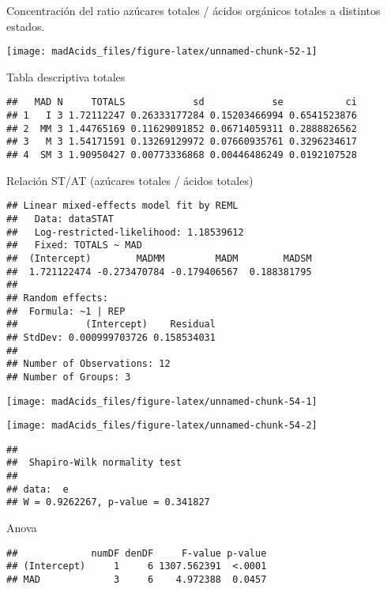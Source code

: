 \documentclass[
]{article}
\begin{document}
Concentración del ratio azúcares totales / ácidos orgánicos totales a
distintos estados.

\begin{center}\texttt{[image: madAcids\_files/figure-latex/unnamed-chunk-52-1]} \end{center}

Tabla descriptiva totales

\begin{verbatim}
##   MAD N     TOTALS            sd            se           ci
## 1   I 3 1.72112247 0.26333177284 0.15203466994 0.6541523876
## 2  MM 3 1.44765169 0.11629091852 0.06714059311 0.2888826562
## 3   M 3 1.54171591 0.13269129972 0.07660935761 0.3296234617
## 4  SM 3 1.90950427 0.00773336868 0.00446486249 0.0192107528
\end{verbatim}

Relación ST/AT (azúcares totales / ácidos totales)

\begin{verbatim}
## Linear mixed-effects model fit by REML
##   Data: dataSTAT 
##   Log-restricted-likelihood: 1.18539612
##   Fixed: TOTALS ~ MAD 
##  (Intercept)        MADMM         MADM        MADSM 
##  1.721122474 -0.273470784 -0.179406567  0.188381795 
## 
## Random effects:
##  Formula: ~1 | REP
##            (Intercept)    Residual
## StdDev: 0.000999703726 0.158534031
## 
## Number of Observations: 12
## Number of Groups: 3
\end{verbatim}

\begin{center}\texttt{[image: madAcids\_files/figure-latex/unnamed-chunk-54-1]} \end{center}

\begin{center}\texttt{[image: madAcids\_files/figure-latex/unnamed-chunk-54-2]} \end{center}

\begin{verbatim}
## 
##  Shapiro-Wilk normality test
## 
## data:  e
## W = 0.9262267, p-value = 0.341827
\end{verbatim}

Anova

\begin{verbatim}
##             numDF denDF     F-value p-value
## (Intercept)     1     6 1307.562391  <.0001
## MAD             3     6    4.972388  0.0457
\end{verbatim}
\end{document}
